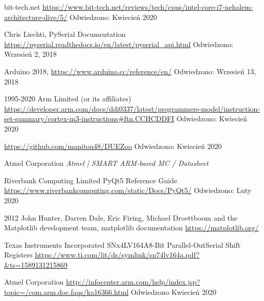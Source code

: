 \documentclass[a4paper,12pt]{article}
\begin{document}
\begin{thebibliography}{99}
        bit-tech.net
        \url{https://www.bit-tech.net/reviews/tech/cpus/intel-core-i7-nehalem-architecture-dive/5/}
        Odwiedzono:
        Kwiecień 2020

        Chris Liechti,	
        PySerial Documentation
	\url{https://pyserial.readthedocs.io/en/latest/pyserial_api.html}
        Odwiedzono: Wrzesień 2, 2018
        
	 Arduino 2018,
	 \url{https://www.arduino.cc/reference/en/}
        Odwiedzono: Wrzesień 13, 2018	 
        
        1995-2020 Arm Limited (or its affiliates)
        \url{https://developer.arm.com/docs/ddi0337/latest/programmers-model/instruction-set-summary/cortex-m3-instructions#ftn.CCHCDDFI}
        Odwiedzono: Kwiecień 2020

        \url{https://github.com/manitou48/DUEZoo}
        Odwiedzono: Kwiecień 2020

        Atmel Corporation
        \textit{Atmel | SMART ARM-based MC  / Datasheet}

        Riverbank Computing Limited
        PyQt5 Reference Guide
        \url{https://www.riverbankcomputing.com/static/Docs/PyQt5/}
        Odwiedzono: Luty 2020

        2012 John Hunter, Darren Dale, Eric Firing, Michael Droettboom and the Matplotlib development team,
        matplotlib documentation
        \url{https://matplotlib.org/}

        Texas Instruments Incorporated
        SNx4LV164A8-Bit Parallel-OutSerial Shift Registers
        \url{https://www.ti.com/lit/ds/symlink/sn74lv164a.pdf?&ts=1589131215869}

        Atmel Corporation
        \url{http://infocenter.arm.com/help/index.jsp?topic=/com.arm.doc.faqs/ka16366.html}
        Odwiedzono Kwiecień 2020

\end{thebibliography}
\end{document}
